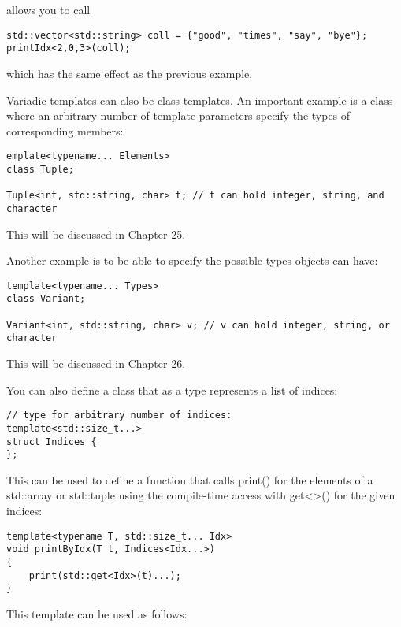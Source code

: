 allows you to call

\begin{lstlisting}[style=styleCXX]
std::vector<std::string> coll = {"good", "times", "say", "bye"};
printIdx<2,0,3>(coll);
\end{lstlisting}

which has the same effect as the previous example.


Variadic templates can also be class templates. An important example is a class where an arbitrary number of template parameters specify the types of corresponding members:

\begin{lstlisting}[style=styleCXX]
emplate<typename... Elements>
class Tuple;

Tuple<int, std::string, char> t; // t can hold integer, string, and character
\end{lstlisting}

This will be discussed in Chapter 25.

Another example is to be able to specify the possible types objects can have:

\begin{lstlisting}[style=styleCXX]
template<typename... Types>
class Variant;

Variant<int, std::string, char> v; // v can hold integer, string, or character
\end{lstlisting}

This will be discussed in Chapter 26.

You can also define a class that as a type represents a list of indices:

\begin{lstlisting}[style=styleCXX]
// type for arbitrary number of indices:
template<std::size_t...>
struct Indices {
};
\end{lstlisting}

This can be used to define a function that calls print() for the elements of a std::array or std::tuple using the compile-time access with get<>() for the given indices:

\begin{lstlisting}[style=styleCXX]
template<typename T, std::size_t... Idx>
void printByIdx(T t, Indices<Idx...>)
{
	print(std::get<Idx>(t)...);
}
\end{lstlisting}

This template can be used as follows:

